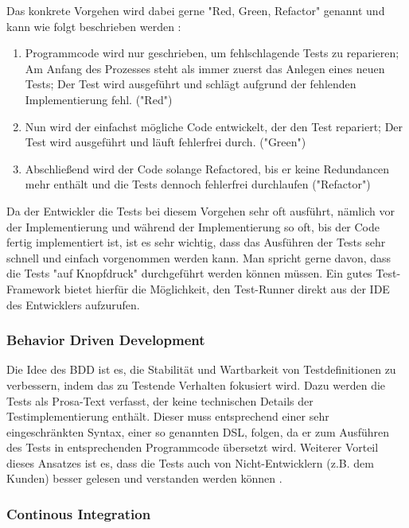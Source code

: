 Das konkrete Vorgehen wird dabei gerne "Red, Green, Refactor" genannt und kann wie folgt beschrieben werden \citep[Vgl.][S. 10]{Kleivane11}:

\begin{enumerate}
	\item Programmcode wird nur geschrieben, um fehlschlagende Tests zu reparieren; Am Anfang des Prozesses steht als immer zuerst das Anlegen eines neuen Tests; Der Test wird ausgeführt und schlägt aufgrund der fehlenden Implementierung fehl. ("Red")
	\item Nun wird der einfachst mögliche Code entwickelt, der den Test repariert; Der Test wird ausgeführt und läuft fehlerfrei durch. ("Green")
	\item Abschließend wird der Code solange Refactored, bis er keine Redundancen mehr enthält und die Tests dennoch fehlerfrei durchlaufen ("Refactor")
\end{enumerate}

Da der Entwickler die Tests bei diesem Vorgehen sehr oft ausführt, nämlich vor der Implementierung und während der Implementierung so oft, bis der Code fertig implementiert ist, ist es sehr wichtig, dass das Ausführen der Tests sehr schnell und einfach vorgenommen werden kann. Man spricht gerne davon, dass die Tests "auf Knopfdruck" durchgeführt werden können müssen. Ein gutes Test-Framework bietet hierfür die Möglichkeit, den Test-Runner direkt aus der \ac{IDE} des Entwicklers aufzurufen.

\subsubsection{Behavior Driven Development}

Die Idee des \ac{BDD} ist es, die Stabilität und Wartbarkeit von Testdefinitionen zu verbessern, indem das zu Testende Verhalten fokusiert wird. Dazu werden die Tests als Prosa-Text verfasst, der keine technischen Details der Testimplementierung enthält. Dieser muss entsprechend einer sehr eingeschränkten Syntax, einer so genannten \ac{DSL}, folgen, da er zum Ausführen des Tests in entsprechenden Programmcode übersetzt wird. Weiterer Vorteil dieses Ansatzes ist es, dass die Tests auch von Nicht-Entwicklern (z.B. dem Kunden) besser gelesen und verstanden werden können \citep[Vgl.][S. 5-6]{Trostler13}.

\subsubsection{Continous Integration}

